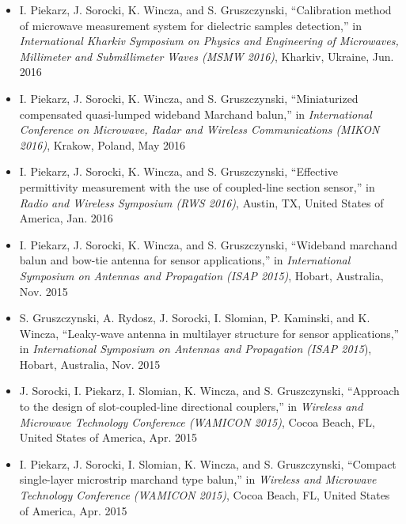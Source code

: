 \begin{itemize}[nosep]
\item I. Piekarz, J. Sorocki, K. Wincza, and S. Gruszczynski, “Calibration method of microwave
measurement system for dielectric samples detection,” in\textit{ International Kharkiv Symposium on Physics and Engineering of Microwaves, Millimeter and Submillimeter Waves (MSMW 2016)},
Kharkiv, Ukraine, Jun. 2016
\item I. Piekarz, J. Sorocki, K. Wincza, and S. Gruszczynski, “Miniaturized compensated quasi-lumped wideband Marchand balun,” in \textit{International Conference on Microwave, Radar and Wireless Communications (MIKON 2016)}, Krakow, Poland, May 2016
\item I. Piekarz, J. Sorocki, K. Wincza, and S. Gruszczynski, “Effective permittivity measurement with the use of coupled-line section sensor,” in \textit{Radio and Wireless Symposium (RWS 2016)}, Austin, TX, United States of America, Jan. 2016
\item I. Piekarz, J. Sorocki, K. Wincza, and S. Gruszczynski, “Wideband marchand balun and bow-tie antenna for sensor applications,” in \textit{International Symposium on Antennas and Propagation (ISAP 2015)}, Hobart, Australia, Nov. 2015
\item S. Gruszczynski, A. Rydosz, J. Sorocki, I. Slomian, P. Kaminski, and K. Wincza, “Leaky-wave
antenna in multilayer structure for sensor applications,” in \textit{International Symposium on Antennas and Propagation (ISAP 2015}), Hobart, Australia, Nov. 2015
\item J. Sorocki, I. Piekarz, I. Slomian, K. Wincza, and S. Gruszczynski, “Approach to the design
of slot-coupled-line directional couplers,” in \textit{Wireless and Microwave Technology Conference (WAMICON 2015)}, Cocoa Beach, FL, United States of America, Apr. 2015
\item I. Piekarz, J. Sorocki, I. Slomian, K. Wincza, and S. Gruszczynski, “Compact single-layer
microstrip marchand type balun,” in \textit{Wireless and Microwave Technology Conference (WAMICON
2015)}, Cocoa Beach, FL, United States of America, Apr. 2015

\end{itemize}
